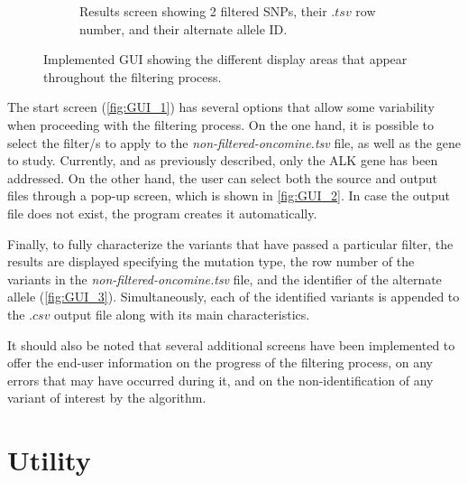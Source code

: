 \begin{figure}[ht]
\begin{subfigure}{0.52\textwidth}
        \caption{Results screen showing 2 filtered SNPs, their $.tsv$ row number, and their alternate allele ID.}
        \label{fig:GUI_3}
    \end{subfigure}
    \hfill
    \caption{Implemented GUI showing the different display areas that appear throughout the filtering process.}
    \label{fig:GUI}
\end{figure}

The start screen (\autoref{fig:GUI_1}) has several options that allow some variability when proceeding with the filtering process. On the one hand, it is possible to select the filter\slash s to apply to the \textit{non-filtered-oncomine.tsv} file, as well as the gene to study. Currently, and as previously described, only the ALK gene has been addressed. On the other hand, the user can select both the source and output files through a pop-up screen, which is shown in \autoref{fig:GUI_2}. In case the output file does not exist, the program creates it automatically.

Finally, to fully characterize the variants that have passed a particular filter, the results are displayed specifying the mutation type, the row number of the variants in the \textit{non-filtered-oncomine.tsv} file, and the identifier of the alternate allele (\autoref{fig:GUI_3}). Simultaneously, each of the identified variants is appended to the $.csv$ output file along with its main characteristics.

It should also be noted that several additional screens have been implemented to offer the end-user information on the progress of the filtering process, on any errors that may have occurred during it, and on the non-identification of any variant of interest by the algorithm.

\section{Utility}



